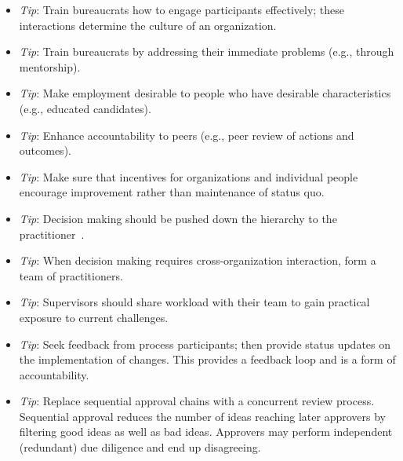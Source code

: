 \begin{itemize}
\item \textit{Tip}: Train bureaucrats how to engage participants effectively; these interactions determine the culture of an organization. 
\item \textit{Tip}: Train bureaucrats by addressing their immediate problems (e.g., through mentorship).
\item \textit{Tip}: Make employment desirable to people who have desirable characteristics (e.g., educated candidates).
\item \textit{Tip}: Enhance accountability to peers (e.g., peer review of actions and outcomes).
\item \textit{Tip}: Make sure that incentives for organizations and individual people encourage improvement rather than maintenance of status quo.
\item \textit{Tip}: Decision making should be pushed down the hierarchy to the practitioner~\cite{2013_Marquet}.
\item \textit{Tip}: When decision making requires cross-organization interaction, form a team of practitioners.
\item \textit{Tip}: Supervisors should share workload with their team to gain practical exposure to current challenges.
\item \textit{Tip}: Seek feedback from process participants; then provide status updates on the implementation of changes. This provides a feedback loop and is a form of accountability.

\item \textit{Tip}: Replace sequential approval chains with a concurrent review process. Sequential approval reduces the number of ideas reaching later approvers by filtering good ideas as well as bad ideas. Approvers may perform independent (redundant) due diligence and end up disagreeing. 
\end{itemize}
